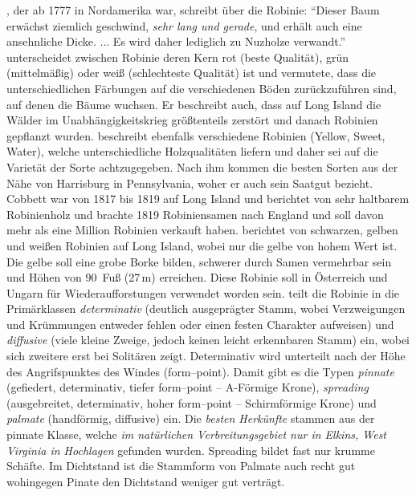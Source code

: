\documentclass[twocolumn]{scrartcl}
\begin{document}
\citet[S.~67]{wangenheim1781nordamericanischeHolzarten}, der ab 1777
in Nordamerika war, schreibt über die Robinie: \enquote{Dieser Baum
erwächst ziemlich geschwind, \emph{sehr lang und gerade}, und erhält
auch eine ansehnliche Dicke. ... Es wird daher lediglich zu Nuzholze
verwandt.} \citet[S.~249]{Michaux1813arbres} unterscheidet
zwischen Robinie deren Kern rot (beste Qualität), grün (mittelmäßig)
oder weiß (schlechteste Qualität) ist und vermutete, dass die unterschiedlichen
Färbungen auf die verschiedenen Böden zurückzuführen sind, auf denen die Bäume wuchsen.
Er beschreibt auch, dass auf Long
Island die Wälder im Unabhängigkeitskrieg größtenteils zerstört und
danach Robinien gepflanzt wurden. \cite{cobbett1825woodlands}
beschreibt ebenfalls verschiedene Robinien (Yellow, Sweet, Water),
welche unterschiedliche Holzqualitäten liefern und daher sei auf die
Varietät der Sorte achtzugegeben. Nach ihm kommen die besten
Sorten aus der Nähe von Harrisburg in Pennsylvania, woher er auch
sein Saatgut bezieht. Cobbett war von 1817 bis 1819 auf Long Island
und berichtet von sehr haltbarem Robinienholz und brachte 1819
Robiniensamen nach England und soll davon mehr als eine Million
Robinien verkauft haben. \cite{hicks1883robinie} berichtet von
schwarzen, gelben und weißen Robinien auf Long Island, wobei nur die
gelbe von hohem Wert ist. Die gelbe soll eine grobe Borke bilden,
schwerer durch Samen vermehrbar sein und Höhen von 90~Fuß (27\,m)
erreichen. Diese Robinie soll in Österreich und Ungarn für
Wiederaufforstungen verwendet worden sein. \cite{hopp1941robinie} teilt
die Robinie in die Primärklassen \emph{determinativ} (deutlich ausgeprägter
Stamm, wobei Verzweigungen und Krümmungen entweder fehlen oder
einen festen Charakter aufweisen) und \emph{diffusive} (viele kleine Zweige,
jedoch keinen leicht erkennbaren Stamm) ein, wobei sich zweitere erst
bei Solitären zeigt. Determinativ wird unterteilt nach der Höhe des
Angrifspunktes des Windes (form--point). Damit gibt es die Typen
\emph{pinnate} (gefiedert, determinativ, tiefer form--point --
A-Förmige Krone), \emph{spreading} (ausgebreitet, determinativ, hoher
form--point -- Schirmförmige Krone) und \emph{palmate} (handförmig,
diffusive) ein. Die \emph{besten Herkünfte} stammen aus der pinnate Klasse,
welche \emph{im natürlichen Verbreitungsgebiet nur in Elkins, West Virginia
in Hochlagen} gefunden wurden. Spreading bildet fast nur krumme
Schäfte. Im Dichtstand ist die Stammform von Palmate auch recht gut
wohingegen Pinate den Dichtstand weniger gut verträgt.
\end{document}
